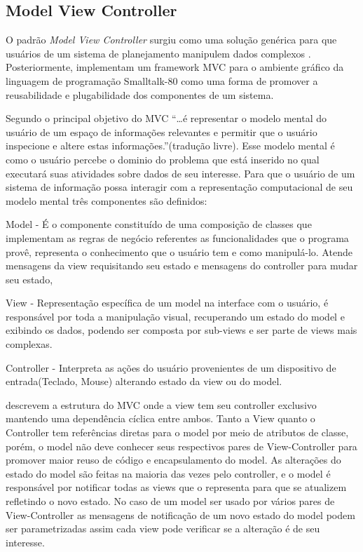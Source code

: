 \documentclass[conference]{IEEEtran}
\begin{document}
\subsection{Model View Controller}

O padrão \textit{Model View Controller} surgiu como uma solução genérica para
que usuários de um sistema de planejamento manipulem dados complexos
. Posteriormente, 
implementam um framework MVC para o ambiente gráfico da linguagem de programação
Smalltalk-80 como uma forma de promover a reusabilidade e plugabilidade dos
componentes de um sistema.

Segundo  o principal objetivo do MVC
``\ldots é representar o modelo mental do usuário de um espaço de informações
relevantes e permitir que o usuário inspecione e altere estas
informações.''(tradução livre).
Esse modelo mental é como o usuário percebe o dominio do problema que está inserido no qual executará suas atividades sobre dados de seu interesse. Para que o usuário de um sistema de
informação possa interagir com a representação computacional  de seu modelo
mental três componentes são definidos:

Model - É o componente constituído de uma composição de classes que implementam
as regras de negócio referentes as funcionalidades que o programa provê,
representa o  conhecimento que o usuário tem e como manipulá-lo. Atende
mensagens da view requisitando seu estado e mensagens do controller para mudar
seu estado,

View - Representação específica de um model na interface com o usuário, é 
responsável por toda a manipulação visual, recuperando um estado do model e
exibindo os dados, podendo ser composta por sub-views e ser parte de views mais
complexas.

Controller - Interpreta as ações do usuário provenientes de um dispositivo de
entrada(Teclado, Mouse) alterando estado da view ou do model.




 descrevem a estrutura do MVC onde a view tem seu
controller exclusivo mantendo uma dependência cíclica entre ambos. Tanto a View
quanto o Controller tem referências diretas para o model por meio de atributos
de classe, porém, o model não deve conhecer seus respectivos pares de
View-Controller para promover maior reuso de código e encapsulamento do model.
As alterações do estado do model são feitas na maioria das vezes pelo controller, e
o model é responsável por notificar todas as views que o representa para que
se atualizem refletindo o novo estado. No caso de um model ser usado por vários
pares de View-Controller as mensagens de notificação de um novo estado do model
podem ser parametrizadas assim cada view pode verificar se a alteração é de seu
interesse. 
\end{document}
